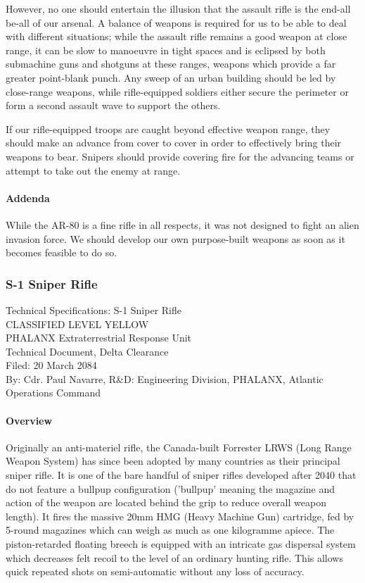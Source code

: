 However, no one should entertain the illusion that the assault rifle is the end-all be-all of our arsenal. A balance of weapons is required for us to be able to deal with different situations; while the assault rifle remains a good weapon at close range, it can be slow to manoeuvre in tight spaces and is eclipsed by both submachine guns and shotguns at these ranges, weapons which provide a far greater point-blank punch. Any sweep of an urban building should be led by close-range weapons, while rifle-equipped soldiers either secure the perimeter or form a second assault wave to support the others.

If our rifle-equipped troops are caught beyond effective weapon range, they should make an advance from cover to cover in order to effectively bring their weapons to bear. Snipers should provide covering fire for the advancing teams or attempt to take out the enemy at range.
\paragraph*{Addenda}
While the AR-80 is a fine rifle in all respects, it was not designed to fight an alien invasion force. We should develop our own purpose-built weapons as soon as it becomes feasible to do so.

\newpage

\subsubsection*{S-1 Sniper Rifle}
Technical Specifications: S-1 Sniper Rifle\\
CLASSIFIED LEVEL YELLOW\\
PHALANX Extraterrestrial Response Unit\\
Technical Document, Delta Clearance\\
Filed: 20 March 2084\\
By: Cdr. Paul Navarre, R&D: Engineering Division, PHALANX, Atlantic Operations Command\\
\paragraph*{Overview}
Originally an anti-materiel rifle, the Canada-built Forrester LRWS (Long Range Weapon System) has since been adopted by many countries as their principal sniper rifle. It is one of the bare handful of sniper rifles developed after 2040 that do not feature a bullpup configuration ('bullpup' meaning the magazine and action of the weapon are located behind the grip to reduce overall weapon length). It fires the massive 20mm HMG (Heavy Machine Gun) cartridge, fed by 5-round magazines which can weigh as much as one kilogramme apiece. The piston-retarded floating breech is equipped with an intricate gas dispersal system which decreases felt recoil to the level of an ordinary hunting rifle. This allows quick repeated shots on semi-automatic without any loss of accuracy.


